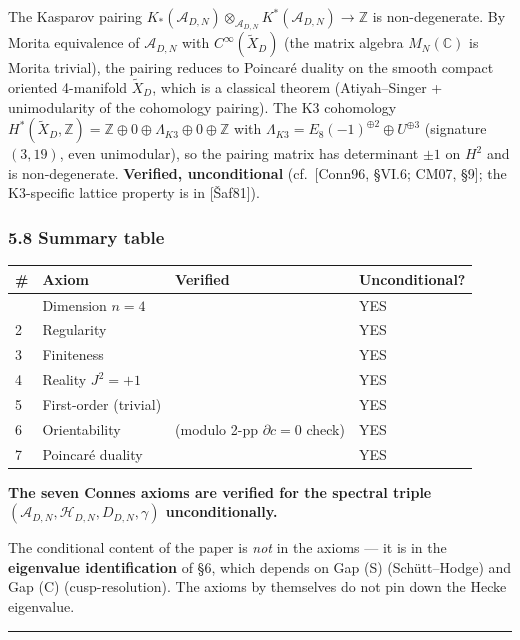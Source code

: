 \documentclass[
  11pt,
  a4paper,
]{amsart}
\begin{document}
The Kasparov pairing
\(K_*(\mathcal{A}_{D,N}) \otimes_{\mathcal{A}_{D,N}} K^*(\mathcal{A}_{D,N}) \to \mathbb{Z}\)
is non-degenerate. By Morita equivalence of \(\mathcal{A}_{D,N}\) with
\(C^\infty(\widetilde{X}_D)\) (the matrix algebra \(M_N(\mathbb{C})\) is Morita
trivial), the pairing reduces to Poincaré duality on the smooth compact
oriented 4-manifold \(\widetilde{X}_D\), which is a classical theorem (Atiyah--Singer
+ unimodularity of the cohomology pairing). The K3 cohomology
\(H^*(\widetilde{X}_D, \mathbb{Z}) = \mathbb{Z} \oplus 0 \oplus \Lambda_{K3} \oplus 0 \oplus \mathbb{Z}\)
with \(\Lambda_{K3} = E_8(-1)^{\oplus 2} \oplus U^{\oplus 3}\) (signature
\((3, 19)\), even unimodular), so the pairing matrix has determinant \(\pm 1\) on
\(H^2\) and is non-degenerate. \textbf{Verified, unconditional} (cf.~{[}Conn96, §VI.6;
CM07, §9{]}; the K3-specific lattice property is in {[}Šaf81{]}).

\hypertarget{summary-table}{%
\subsubsection{5.8 Summary table}\label{summary-table}}

\begin{longtable}[]{@{}llll@{}}
\toprule\noalign{}
\# & Axiom & Verified & Unconditional? \\
\midrule\noalign{}
\endhead
\bottomrule\noalign{}
\endlastfoot
1 & Dimension \(n = 4\) & & YES \\
2 & Regularity & & YES \\
3 & Finiteness & & YES \\
4 & Reality \(J^2 = +1\) & & YES \\
5 & First-order (trivial) & & YES \\
6 & Orientability & (modulo 2-pp \(\partial c = 0\) check) & YES \\
7 & Poincaré duality & & YES \\
\end{longtable}

\textbf{The seven Connes axioms are verified for the spectral triple
\((\mathcal{A}_{D,N}, \mathcal{H}_{D,N}, D_{D,N}, \gamma)\) unconditionally.}

The conditional content of the paper is \emph{not} in the axioms --- it is in the
\textbf{eigenvalue identification} of §6, which depends on Gap (S) (Schütt--Hodge)
and Gap (C) (cusp-resolution). The axioms by themselves do not pin down the
Hecke eigenvalue.

\begin{center}\rule{0.5\linewidth}{0.5pt}\end{center}
\end{document}
